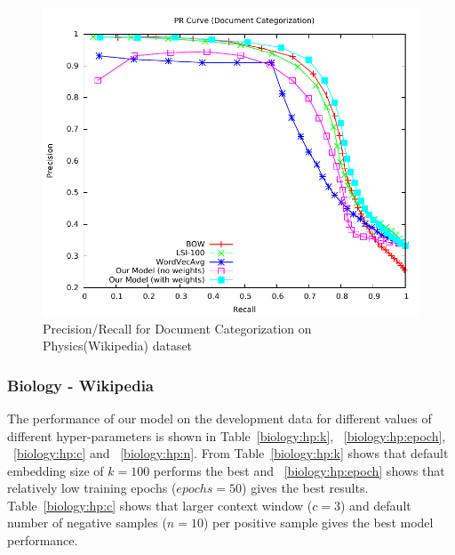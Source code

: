 \begin{figure}[tb]
\centering
        \includegraphics[width=0.8\columnwidth]{figs/pr/physics-cs-scala.pdf}
        \vskip -4mm
    \caption{\footnotesize Precision/Recall for Document Categorization on Physics(Wikipedia) dataset}
    \label{fig:pr:physics:cs} 
\end{figure}

\subsubsection{Biology - Wikipedia}
The performance of our model on the development data for different values of different hyper-parameters is shown in Table~\ref{biology:hp:k}, ~\ref{biology:hp:epoch}, ~\ref{biology:hp:c} and ~\ref{biology:hp:n}. From Table~\ref{biology:hp:k} shows that default embedding size of $k = 100$ performs the best and ~\ref{biology:hp:epoch} shows that relatively low training epochs ($epochs = 50$) gives the best results. Table~\ref{biology:hp:c} shows that larger context window ($c = 3$) and default number of negative samples ($n = 10$) per positive sample gives the best model performance. 

